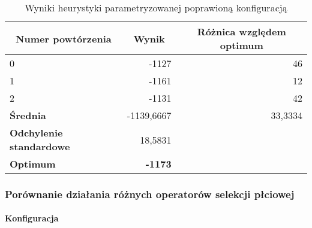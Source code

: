 \documentclass[./FM_mgr.tex]{subfiles}
\begin{document}
\begin{table}[h]
	\caption{Wyniki heurystyki parametryzowanej poprawioną konfiguracją \label{knapsack_tweak_results}}
	\begin{tabular}{|l|r|r}
		\hline
		\multicolumn{1}{|c|}{{\bf Numer powtórzenia}} & \multicolumn{1}{c|}{{\bf Wynik}} & \multicolumn{1}{c|}{{\bf Różnica względem optimum}} \\ \hline  \hline
		0                                             & -1127                            & \multicolumn{1}{r|}{46}                             \\ \hline
		1                                             & -1161                            & \multicolumn{1}{r|}{12}                             \\ \hline
		2                                             & -1131                            & \multicolumn{1}{r|}{42}                             \\ \hline \hline
		{\bf Średnia}                                 & -1139,6667                       & \multicolumn{1}{r|}{33,3334}                        \\ \hline
		{\bf Odchylenie standardowe}                  & 18,5831                          &                                                     \\ \hhline{==~}
		{\bf Optimum}                                 & {\bf -1173}                      &                                                     \\ \cline{1-2}
	\end{tabular}
\end{table}


\subsubsection{Porównanie działania różnych operatorów selekcji płciowej}

\paragraph{Konfiguracja}
\end{document}

